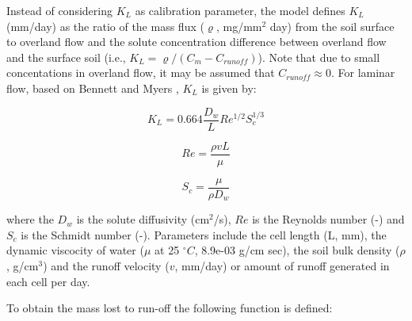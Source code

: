 \documentclass[]{article}
\begin{document}
Instead of considering \(K_L\) as calibration parameter, the model
defines \(K_L\) (mm/day) as the ratio of the mass flux (\(\varrho\),
mg/mm\(^2\) day) from the soil surface to overland flow and the solute
concentration difference between overland flow and the surface soil
(i.e., \(K_L = \varrho /(C_m - C_{runoff})\)). Note that due to small
concentations in overland flow, it may be assumed that
\(C_{runoff} \approx 0\). For laminar flow, based on Bennett and Myers
\citeyearpar{Bennet1982}, \(K_L\) is given by:

\begin{equation}
K_L = 0.664 \frac{D_w}{L}Re^{1/2}S_c^{1/3}
\label{eq:K_L}
\end{equation}

\begin{equation}
Re = \frac{\rho v L}{\mu}
\label{eq:Re}
\end{equation}

\begin{equation}
S_c = \frac{ \mu}{\rho D_w}
\label{eq:S_c}
\end{equation}

where the \(D_w\) is the solute diffusivity (cm\(^2\)/s), \(Re\) is the
Reynolds number (-) and \(S_c\) is the Schmidt number (-). Parameters
include the cell length (L, mm), the dynamic viscocity of water (\(\mu\)
at 25 \(^\circ C\), 8.9e-03 g/cm sec), the soil bulk density (\(\rho\),
g/cm\(^3\)) and the runoff velocity (\(v\), mm/day) or amount of runoff
generated in each cell per day.

To obtain the mass lost to run-off the following function is defined:
\end{document}
